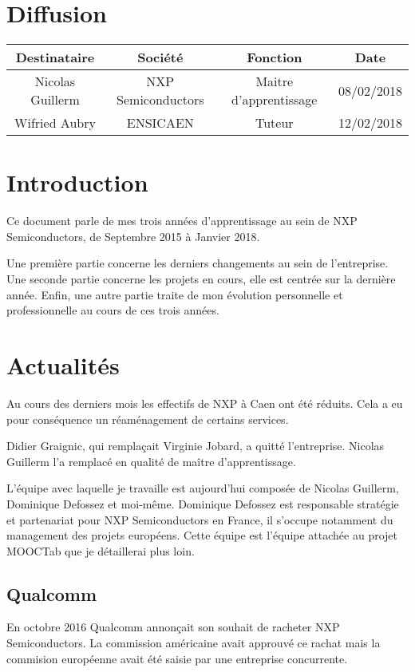 \documentclass[french,12pt,a4paper,titlepage,openright,openbib]{report}
\begin{document}
{\let \clearpage \relax \chapter*{Diffusion}}
\begin{table}[ht]
	\label{tab:diffusion}
	\centering
	\begin{tabular}{|c|c|c|c|}
		\hline
		{\bf Destinataire} & {\bf Société}      & {\bf Fonction}   		 & {\bf Date}\\
		\hline
		Nicolas Guillerm   & NXP Semiconductors & Maitre d'apprentissage & 08/02/2018 \\
		\hline
		Wifried Aubry      & ENSICAEN 			& Tuteur				 & 12/02/2018 \\
		\hline
	\end{tabular}
\end{table}

\chapter{Introduction}
Ce document parle de mes trois années d'apprentissage au sein de NXP Semiconductors, de Septembre 2015 à Janvier 2018.

Une première partie concerne les derniers changements au sein de l'entreprise.
Une seconde partie concerne les projets en cours, elle est centrée sur la dernière année.
Enfin, une autre partie traite de mon évolution personnelle et professionnelle au cours de ces trois années.

\chapter{Actualités}
Au cours des derniers mois les effectifs de NXP à Caen ont été réduits. Cela a eu pour conséquence un réaménagement de certains services.

Didier Graignic, qui remplaçait Virginie Jobard, a quitté l'entreprise. Nicolas Guillerm l'a remplacé en qualité de maître d'apprentissage.

L'équipe avec laquelle je travaille est aujourd'hui composée de Nicolas Guillerm, Dominique Defossez et moi-même. Dominique Defossez est responsable stratégie et partenariat pour NXP Semiconductors en France, il s'occupe notamment du management des projets européens.
Cette équipe est l'équipe attachée au projet MOOCTab que je détaillerai plus loin.
\section{Qualcomm}
En octobre 2016 Qualcomm annonçait son souhait de racheter NXP Semiconductors. La commission américaine avait approuvé ce rachat mais la commision européenne avait été saisie par une entreprise concurrente.
\end{document}
